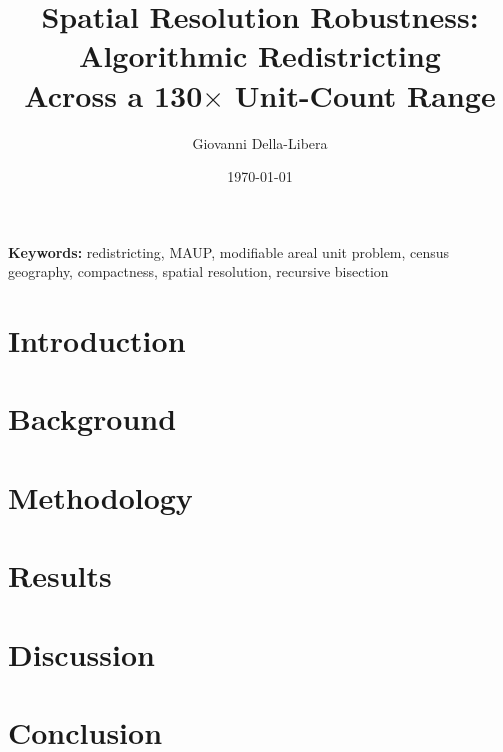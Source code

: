 \documentclass[12pt]{article}
\title{Spatial Resolution Robustness: Algorithmic Redistricting\\
Across a 130$\times$ Unit-Count Range}
\author{Giovanni Della-Libera}
\date{\today}
\begin{document}
\maketitle

\begin{abstract}

\end{abstract}

\noindent\textbf{Keywords:} redistricting, MAUP, modifiable areal unit problem,
census geography, compactness, spatial resolution, recursive bisection

\section{Introduction}


\section{Background}


\section{Methodology}


\section{Results}


\section{Discussion}


\section{Conclusion}




\end{document}
